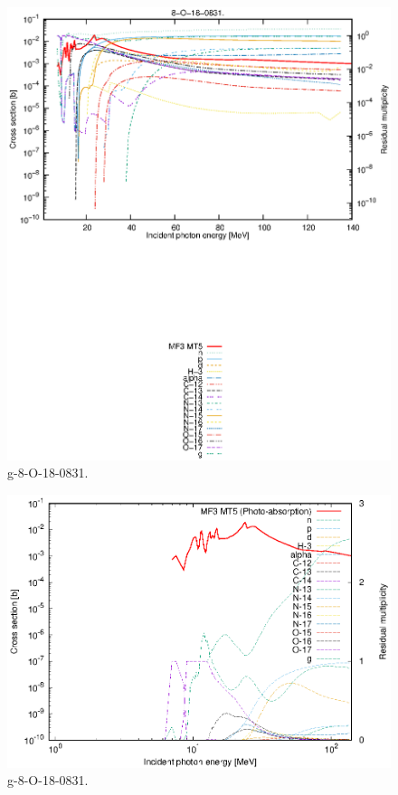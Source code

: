 \begin{figure}
 \includegraphics[width=\linewidth]{eps/g_8-O-18_0831.eps}
  \caption{g-8-O-18-0831.}
\end{figure}
\newpage \clearpage

\begin{figure}
 \includegraphics[width=\linewidth]{eps-log/g_8-O-18_0831.eps}
 \caption{g-8-O-18-0831.}
\end{figure}
\newpage \clearpage

